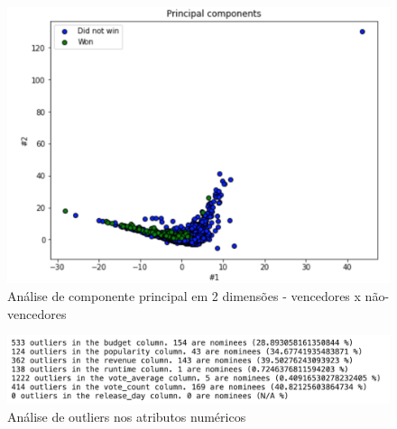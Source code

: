         
        \begin{figure}[htb]
        	\caption{\label{pca_2}Análise de componente principal em 2 dimensões - vencedores x não-vencedores}
        	\begin{center}
        		\includegraphics[scale=0.7]{pca_2.png}
        	\end{center}
        \end{figure}
        
        
        \begin{figure}[htb]
        	\caption{\label{outliers}Análise de outliers nos atributos numéricos}
        	\begin{center}
        		\includegraphics[scale=0.7]{outliers.png}
        	\end{center}
        \end{figure}
        
